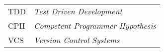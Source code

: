 \begin{longtable}{ll}
  TDD & \textit{Test Driven Development} \\
  CPH & \textit{Competent Programmer Hypothesis} \\
  VCS & \textit{Version Control Systems}
\end{longtable}

